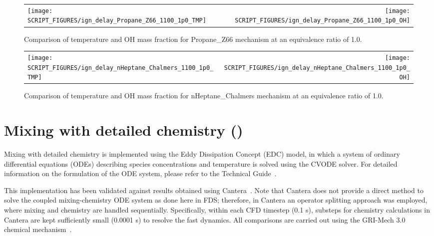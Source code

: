 \documentclass[11pt]{book}
\begin{document}
\begin{figure}[p]
\begin{tabular*}{\textwidth}{lr}
\texttt{[image: SCRIPT\_FIGURES/ign\_delay\_Propane\_Z66\_1100\_1p0\_TMP]} &
\texttt{[image: SCRIPT\_FIGURES/ign\_delay\_Propane\_Z66\_1100\_1p0\_OH]}
\end{tabular*}
\caption[Results of the  test cases]{Comparison of temperature and OH mass fraction for Propane\_Z66 mechanism at an equivalence ratio of 1.0.}
\label{fig:ign_delay_Propane_Z66_phi_1.0}
\end{figure}

\begin{figure}[p]
\begin{tabular*}{\textwidth}{lr}
\texttt{[image: SCRIPT\_FIGURES/ign\_delay\_nHeptane\_Chalmers\_1100\_1p0\_TMP]} &
\texttt{[image: SCRIPT\_FIGURES/ign\_delay\_nHeptane\_Chalmers\_1100\_1p0\_OH]}
\end{tabular*}
\caption[Results of the  test cases]{Comparison of temperature and OH mass fraction for nHeptane\_Chalmers mechanism at an equivalence ratio of 1.0.}
\label{fig:ign_delay_nHeptane_Chalmers_phi_1.0}
\end{figure}


\section{Mixing with detailed chemistry ()}
\label{edc_mixing_cvode}

Mixing with detailed chemistry is implemented using the Eddy Dissipation Concept (EDC) model, in which a system of ordinary differential equations (ODEs) describing species concentrations and temperature is solved using the CVODE solver. For detailed information on the formulation of the ODE system, please refer to the Technical Guide~\cite{FDS_Math_Guide}.

This implementation has been validated against results obtained using Cantera~\cite{cantera:2023}. Note that Cantera does not provide a direct method to solve the coupled mixing-chemistry ODE system as done here in FDS; therefore, in Cantera an operator splitting approach was employed, where mixing and chemistry are handled sequentially. Specifically, within each CFD timestep (0.1 s), substeps for chemistry calculations in Cantera are kept sufficiently small (0.0001 s) to resolve the fast dynamics. All comparisons are carried out using the GRI-Mech 3.0 chemical mechanism~\cite{gri3:1999}.
\end{document}
